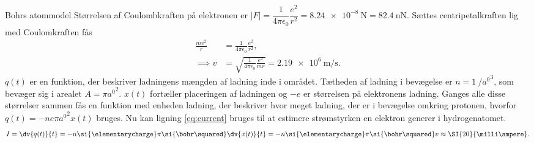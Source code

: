 \begin{opgave}{Bohrs atommodel}
    \opg Størrelsen af Coulombkraften på elektronen er $|F| = \dfrac{1}{4\pi\epsilon_0}\dfrac{e^2}{r^2} = \SI{8.24e-8}{\newton} = \SI{82.4}{\nano\newton}$.
    \opg Sættes centripetalkraften lig med Coulomkraften fås
    \begin{align*}
        \frac{mv^2}{r} &= \frac{1}{4\pi\epsilon_0}\frac{e^2}{r^2}, \\
        \implies v &= \sqrt{\frac{1}{4\pi\epsilon_0}\frac{e^2}{mr}} = \SI{2.19e6}{\metre\per\second}.
    \end{align*}
    \opg $q(t)$ er en funktion, der beskriver ladningens mængden af ladning inde i området. Tætheden af ladning i bevægelse er $n = \SI{1}{\per\cubic\bohr}$, som bevæger sig i arealet $A = \pi\si{\bohr}^2$. $x(t)$ fortæller placeringen af ladningen og $-\si{\elementarycharge}$ er størrelsen på elektronens ladning. Ganges alle disse størrelser sammen fås en funktion med enheden ladning, der beskriver hvor meget ladning, der er i bevægelse omkring protonen, hvorfor $q(t) = -n\si{\elementarycharge}\pi\si{\bohr\squared}x(t)$ bruges.
    \opg Nu kan ligning \eqref{eq:current} bruges til at estimere strømstyrken en elektron generer i hydrogenatomet.
    \begin{align*}
        I = \dv{q(t)}{t} = -n\si{\elementarycharge}\pi\si{\bohr\squared}\dv{x(t)}{t} = -n\si{\elementarycharge}\pi\si{\bohr\squared}v \approx \SI{20}{\milli\ampere}.
    \end{align*}
\end{opgave}

